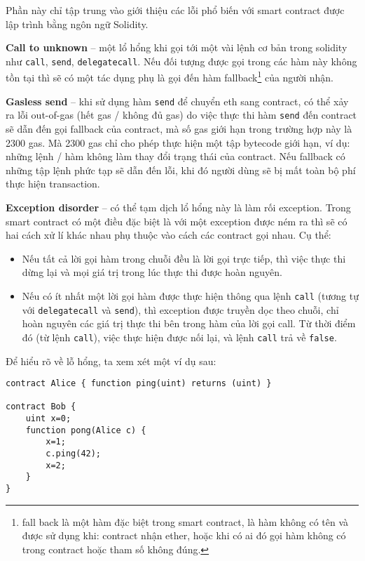 \documentclass[../main-report.tex]{subfiles}
\begin{document}
Phần này chỉ tập trung vào giới thiệu các lỗi phổ biến với smart contract được lập trình bằng ngôn ngữ Solidity.

\textbf{Call to unknown} -- một lổ hổng khi gọi tới một vài lệnh cơ bản trong solidity như \texttt{call}, \texttt{send}, \texttt{delegatecall}. Nếu đối tượng được gọi trong các hàm này không tồn tại thì sẽ có một tác dụng phụ là gọi đến hàm fallback\footnote{fall back là một hàm đặc biệt trong smart contract, là hàm không có tên và được sử dụng khi: contract nhận ether, hoặc khi có ai đó gọi hàm không có trong contract hoặc tham số không đúng.} của người nhận.

\textbf{Gasless send} -- khi sử dụng hàm \texttt{send} để chuyển \gls{eth} sang contract, có thể xảy ra lỗi out-of-gas (hết gas / không đủ gas) do việc thực thi hàm \texttt{send} đến contract sẽ dẫn đến gọi fallback của contract, mà số gas giới hạn trong trường hợp này là 2300 gas. Mà 2300 gas chỉ cho phép thực hiện một tập bytecode giới hạn, ví dụ: những lệnh / hàm không làm thay đổi trạng thái của contract. Nếu fallback có những tập lệnh phức tạp sẽ dẫn đến lỗi, khi đó người dùng sẽ bị mất toàn bộ phí thực hiện transaction.

\textbf{Exception disorder} -- có thể tạm dịch lổ hổng này là làm rối exception. Trong smart contract có một điều đặc biệt là với một exception được ném ra thì sẽ có hai cách xử lí khác nhau phụ thuộc vào cách các contract gọi nhau. Cụ thể:

\begin{itemize}
\item Nếu tất cả lời gọi hàm trong chuỗi đều là lời gọi trực tiếp, thì việc thực thi dừng lại và mọi giá trị trong lúc thực thi được hoàn nguyên.
\item Nếu có ít nhất một lời gọi hàm được thực hiện thông qua lệnh \texttt{call} (tương tự với  \texttt{delegatecall} và \texttt{send}), thì exception được truyền dọc theo chuỗi, chỉ hoàn nguyên các giá trị thực thi bên trong hàm của lời gọi call. Từ thời điểm đó (từ lệnh \texttt{call}), việc thực hiện được nối lại, và lệnh \texttt{call} trả về \texttt{false}.
\end{itemize}

Để hiểu rõ về lỗ hổng, ta xem xét một ví dụ sau:

\begin{lstlisting}
contract Alice { function ping(uint) returns (uint) }

contract Bob { 
    uint x=0;
    function pong(Alice c) {
        x=1;
        c.ping(42);
        x=2;
    }
}
\end{lstlisting}
\end{document}
